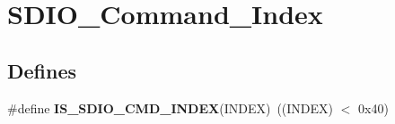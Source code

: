 \hypertarget{group__SDIO__Command__Index}{
\section{SDIO\_\-Command\_\-Index}
\label{group__SDIO__Command__Index}
}
\subsection*{Defines}
\begin{DoxyCompactItemize}
\item 
\hypertarget{group__SDIO__Command__Index_gae988f9f37c4ebb5f5f9866acb30f2880}{
\#define {\bfseries IS\_\-SDIO\_\-CMD\_\-INDEX}(INDEX)~((INDEX) $<$ 0x40)}
\label{group__SDIO__Command__Index_gae988f9f37c4ebb5f5f9866acb30f2880}

\end{DoxyCompactItemize}
